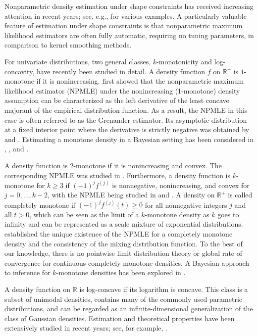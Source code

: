 \documentclass[12pt,letterpaper, twoside, openany]{article}
\theoremstyle{plain}
\begin{document}
Nonparametric density estimation under shape constraints has received increasing attention in recent years;  see, e.g., \cite{groeneboom2014nonparametric} for various examples. A particularly valuable feature of  estimation under shape constraints is that nonparametric maximum likelihood estimators are often fully automatic, requiring no tuning parameters, in comparison to kernel smoothing methods. 

For univariate distributions, two general classes, $k$-monotonicity and log-concavity, have recently been studied in detail. A density function $f$ on $\mathbb{R}^+$ is $1$-monotone if it is nonincreasing.  \cite{grenander1956theory} first showed that the nonparametric maximum likelihood estimator (NPMLE) under the nonincreasing (1-monotone) density assumption can be characterized as the left derivative of the least concave majorant of the empirical distribution function. As a result, the NPMLE in this case is often referred to as the Grenander estimator. Its asymptotic distribution at a fixed interior point where the derivative is strictly negative was obtained by \cite{rao1969estimation} and \cite{Groeneboom1985}. {Estimating a monotone density in a Bayesian setting has been considered in \cite{salomond2014concentration}, \cite{chakraborty2022rates}, and \cite{jongbloed2021bayesian}.}

A density function is $2$-monotone if it is nonincreasing and convex. The corresponding NPMLE was studied in \cite{groeneboom2001estimation}. Furthermore, a density function is $k$-monotone for $k \geq 3$ if  $(-1)^j f^{(j)}$ is nonnegative, nonincreasing, and convex for $j=0,\ldots,k-2$, with the NPMLE being studied in \cite{balabdaoui2007estimation} and \cite{balabdaoui2010estimation}.  A density on $\mathbb{R}^+$ is called completely monotone if $(-1)^j f^{(j)}(t) \geq 0$ for all nonnegative integers $j$ and all $t > 0$, which can be seen as the limit of a $k$-monotone density as $k$ goes to infinity and can be represented as a scale mixture of exponential distributions. \cite{Jewell1982mixtures}  established the unique existence of the NPMLE for a completely monotone density and the consistency of the mixing distribution function. 
To the best of our knowledge, there is no pointwise limit distribution theory or global rate of convergence for continuous completely monotone densities. A Bayesian approach to inference for $k$-monotone densities has been explored in \cite{wang2025bayesian}.

A density function on $\mathbb{R}$ is log-concave if its logarithm is concave. This class is a subset of  unimodal densities, contains many of the commonly used parametric distributions, and can be regarded as an infinite-dimensional generalization of the class of Gaussian densities.  Estimation and theoretical properties have been extensively studied in recent years; see, for example, \cite{dumbgen2009maximum, balabdaoui2009limit, walther2009inference, cule2010theoretical, saumard2014log, samworth2018recent, mariucci2020bayesian, cui2024martingale}. 
\end{document}
